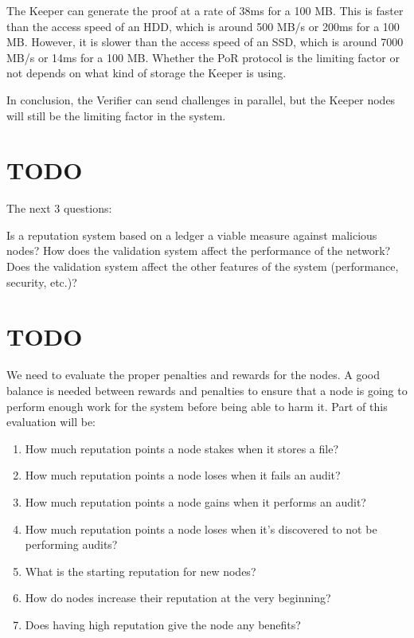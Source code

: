The Keeper can generate the proof at a rate of 38ms for a 100 MB.
This is faster than the access speed of an HDD, which is around 500 MB/s or 200ms for a 100 MB.
However, it is slower than the access speed of an SSD, which is around 7000 MB/s or 14ms for a 100 MB.
Whether the PoR protocol is the limiting factor or not depends on what kind of storage the Keeper is using.

In conclusion, the Verifier can send challenges in parallel, but the Keeper nodes will still be
the limiting factor in the system.

\section{TODO}

The next 3 questions:

    Is a reputation system based on a ledger a viable measure against malicious nodes?
    How does the validation system affect the performance of the network?
    Does the validation system affect the other features of the system (performance, security, etc.)?

\section{TODO}

We need to evaluate the proper penalties and rewards for the nodes.
A good balance is needed between rewards and penalties to ensure that a node is
going to perform enough work for the system before being able to harm it.
Part of this evaluation will be:
\begin{enumerate}
    \item How much reputation points a node stakes when it stores a file?
    \item How much reputation points a node loses when it fails an audit?
    \item How much reputation points a node gains when it performs an audit?
    \item How much reputation points a node loses when it's discovered to not be performing audits?
    \item What is the starting reputation for new nodes?
    \item How do nodes increase their reputation at the very beginning?
    \item Does having high reputation give the node any benefits?
\end{enumerate}

